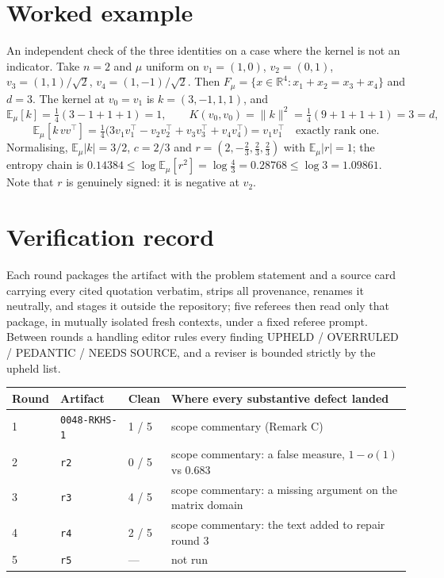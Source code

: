 \documentclass[11pt]{article}
\theoremstyle{remark}
\newcommand{\R}{\mathbb{R}}
\newcommand{\Ex}{\mathbb{E}}
\newcommand{\Fm}{F_\mu}
\begin{document}
\section{Worked example}

An independent check of the three identities on a case where the kernel is not an indicator.
Take $n=2$ and $\mu$ uniform on $v_1=(1,0)$, $v_2=(0,1)$, $v_3=(1,1)/\sqrt2$,
$v_4=(1,-1)/\sqrt2$. Then $\Fm=\{x\in\R^4 : x_1+x_2=x_3+x_4\}$ and $d=3$. The kernel at
$v_0=v_1$ is $k=(3,-1,1,1)$, and
\[
  \Ex_\mu[k]=\tfrac14(3-1+1+1)=1, \qquad K(v_0,v_0)=\|k\|^2=\tfrac14(9+1+1+1)=3=d,
\]
\[
  \Ex_\mu[k\,vv^{\top}] = \tfrac14\big(3v_1v_1^{\top}-v_2v_2^{\top}+v_3v_3^{\top}+v_4v_4^{\top}\big)
  = v_1v_1^{\top} \quad\text{exactly rank one.}
\]
Normalising, $\Ex_\mu|k|=3/2$, $c=2/3$ and $r=(2,-\tfrac23,\tfrac23,\tfrac23)$ with
$\Ex_\mu|r|=1$; the entropy chain is
$0.14384 \leq \log\Ex_\mu[r^2]=\log\tfrac43=0.28768 \leq \log 3 = 1.09861$. Note that $r$ is
genuinely signed: it is negative at $v_2$.

\section{Verification record}

Each round packages the artifact with the problem statement and a source card carrying every
cited quotation verbatim, strips all provenance, renames it neutrally, and stages it outside
the repository; five referees then read only that package, in mutually isolated fresh contexts,
under a fixed referee prompt. Between rounds a handling editor rules every finding
UPHELD / OVERRULED / PEDANTIC / NEEDS SOURCE, and a reviser is bounded strictly by the upheld
list.

\begin{center}
\begin{tabular}{@{}llll@{}}
\toprule
Round & Artifact & Clean & Where every substantive defect landed \\
\midrule
1 & \texttt{0048-RKHS-1}    & 1 / 5 & scope commentary (Remark C) \\
2 & \texttt{r2}             & 0 / 5 & scope commentary: a false measure, $1-o(1)$ vs $0.683$ \\
3 & \texttt{r3}             & 4 / 5 & scope commentary: a missing argument on the matrix domain \\
4 & \texttt{r4}             & 2 / 5 & scope commentary: the text added to repair round 3 \\
5 & \texttt{r5}             & --- & not run \\
\bottomrule
\end{tabular}
\end{center}
\end{document}
